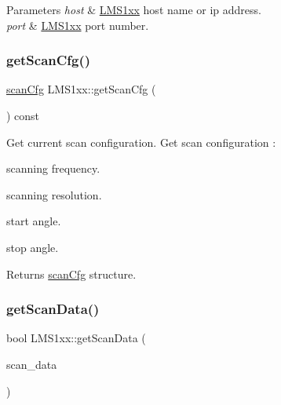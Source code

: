 \begin{DoxyParams}{Parameters}
{\em host} & \hyperlink{classLMS1xx}{L\+M\+S1xx} host name or ip address. \\
\hline
{\em port} & \hyperlink{classLMS1xx}{L\+M\+S1xx} port number. \\
\hline
\end{DoxyParams}
\mbox{\label{classLMS1xx_ac24aca9ae9b4329c6455fb1ad2a6faad}} 
\subsubsection{\texorpdfstring{get\+Scan\+Cfg()}{getScanCfg()}}
{\footnotesize\ttfamily \hyperlink{structscanCfg}{scan\+Cfg} L\+M\+S1xx\+::get\+Scan\+Cfg (\begin{DoxyParamCaption}{ }\end{DoxyParamCaption}) const}



Get current scan configuration. Get scan configuration \+: 


\begin{DoxyItemize}
\item scanning frequency.
\item scanning resolution.
\item start angle.
\item stop angle. \begin{DoxyReturn}{Returns}
\hyperlink{structscanCfg}{scan\+Cfg} structure. 
\end{DoxyReturn}

\end{DoxyItemize}\mbox{\label{classLMS1xx_a079674c2c50e13cc9089e3c0f09a5d28}} 
\subsubsection{\texorpdfstring{get\+Scan\+Data()}{getScanData()}}
{\footnotesize\ttfamily bool L\+M\+S1xx\+::get\+Scan\+Data (\begin{DoxyParamCaption}\item[{\hyperlink{structscanData}{scan\+Data} $\ast$}]{scan\+\_\+data }\end{DoxyParamCaption})}



